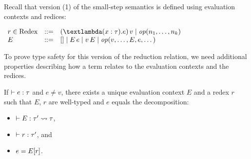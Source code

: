\documentclass{article}
\begin{document}
Recall that version (1) of the small-step semantics is defined
using evaluation contexts and redices:
\begin{center}
    \begin{minipage}[t]{0.95\textwidth}
        \begin{minipage}{0.45\textwidth}
            $\displaystyle
            \begin{array}{lcl}
                \NT{r}{Redex} \NTEq
                    \TApp{(\TFun{(\TAnn{x}{\Gt})}{e})}{v} \NTSep
                    \TOp{n_1,\dots,n_k}
                    \\
                E \NTEq
                    \THole \NTSep
                    \TApp{E}{e} \NTSep
                    \TApp{v}{E} \NTSep
                    \TOp{v,\dots,E,e,\dots}
            \end{array}$
        \end{minipage}
        \begin{minipage}{0.45\textwidth}
            \begin{prooftree}
            \end{prooftree}
        \end{minipage}
    \end{minipage}
\end{center}

To prove type safety for this version of the reduction relation,
we need additional properties describing how a term relates to
the evaluation contexts and the redices.
\begin{prop}
    If $\TTypes{}{e}{\Gt}$ and $e\ne v$, there exists a unique evaluation context $E$
    and a redex $r$ such that $E$, $r$ are well-typed and
    $e$ equals the decomposition:
    \begin{itemize}
        \item $\TTypes{}{E}{\TContext{\Gt'}{\Gt}}$,
        \item $\TTypes{}{r}{\Gt'}$, and
        \item $e = \inhole{E}{r}$.
    \end{itemize}
\end{prop}
\end{document}
